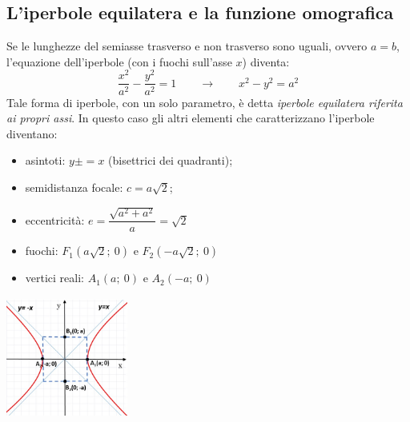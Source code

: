 \subsection{L'iperbole equilatera e la funzione omografica}
\label{subsec:iperbole_omografica}

Se le lunghezze del semiasse trasverso e non trasverso sono uguali, ovvero $a=b$, 
l'equazione dell'iperbole (con i fuochi sull'asse $x$) diventa: 
\begin{equation}
\dfrac{x^{2}}{a^{2}}-\dfrac{y^{2}}{a^{2}}=1 \qquad \longrightarrow \qquad
x^{2}-y^{2} =  a^{2} 
\end{equation}
Tale forma di iperbole, con un solo parametro, è detta 
\emph{iperbole equilatera riferita ai propri assi}. 
In questo caso gli altri elementi che caratterizzano l'iperbole diventano:

\vspace{12pt}
  \noindent\begin{minipage}[c]{.65\textwidth}
  \begin{itemize}
    \item asintoti: $y\pm=x$ (bisettrici dei quadranti);
    \item semidistanza focale: $c=a \sqrt{2} $;
    \item eccentricità: $e = \dfrac{\sqrt{a^{2}+a^{2}}}{a}=\sqrt{2} $
    \item fuochi: $ F_{1} \left(a \sqrt{2};~0\right)$ e 
                        $ F_{2}\left(-a \sqrt{2};~0\right)$
    \item vertici reali: $ A_{1}(a;~0)$ e $A_{2}(-a;~0)$
  \end{itemize}    
  \end{minipage}
  \hfill
  \begin{minipage}[c]{.3\textwidth}
    \includegraphics[height=4cm, width=4cm,]{img/equilatera.jpg}
  \end{minipage}

